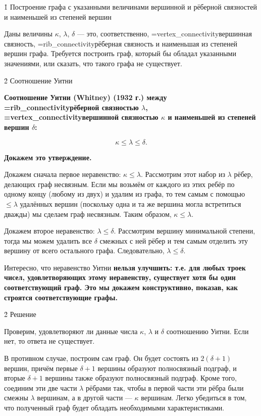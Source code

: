 \h1{ Построение графа с указанными величинами вершинной и рёберной связностей и наименьшей из степеней вершин }

Даны величины $\kappa$, $\lambda$, $\delta$ --- это, соответственно, \algohref=vertex_connectivity{вершинная связность}, \algohref=rib_connectivity{рёберная связность} и наименьшая из степеней вершин графа. Требуется построить граф, который бы обладал указанными значениями, или сказать, что такого графа не существует.


\h2{ Соотношение Уитни }

\bf{Соотношение Уитни (Whitney)} (1932 г.) между \algohref=rib_connectivity{рёберной связностью} $\lambda$, \algohref=vertex_connectivity{вершинной связностью} $\kappa$ и наименьшей из степеней вершин $\delta$:

$$ \kappa \le \lambda \le \delta. $$

\bf{Докажем} это утверждение.

Докажем сначала первое неравенство: $\kappa \le \lambda$. Рассмотрим этот набор из $\lambda$ рёбер, делающих граф несвязным. Если мы возьмём от каждого из этих ребёр по одному концу (любому из двух) и удалим из графа, то тем самым с помощью $\le \lambda$ удалённых вершин (поскольку одна и та же вершина могла встретиться дважды) мы сделаем граф несвязным. Таким образом, $\kappa \le \lambda$.

Докажем второе неравенство: $\lambda \le \delta$. Рассмотрим вершину минимальной степени, тогда мы можем удалить все $\delta$ смежных с ней рёбер и тем самым отделить эту вершину от всего остального графа. Следовательно, $\lambda \le \delta$.

Интересно, что неравенство Уитни \bf{нельзя улучшить}: т.е. для любых троек чисел, удовлетворяющих этому неравенству, существует хотя бы один соответствующий граф. Это мы докажем конструктивно, показав, как строятся соответствующие графы.


\h2{ Решение }

Проверим, удовлетворяют ли данные числа $\kappa$, $\lambda$ и $\delta$ соотношению Уитни. Если нет, то ответа не существует.

В противном случае, построим сам граф. Он будет состоять из $2 (\delta + 1)$ вершин, причём первые $\delta + 1$ вершины образуют полносвязный подграф, и вторые $\delta + 1$ вершины также образуют полносвязный подграф. Кроме того, соединим эти две части $\lambda$ рёбрами так, чтобы в первой части эти рёбра были смежны $\lambda$ вершинам, а в другой части --- $\kappa$ вершинам. Легко убедиться в том, что полученный граф будет обладать необходимыми характеристиками.
